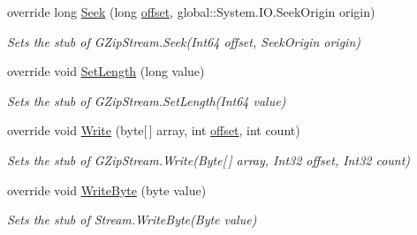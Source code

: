 \begin{DoxyCompactItemize}
override long \hyperlink{class_system_1_1_i_o_1_1_compression_1_1_fakes_1_1_stub_g_zip_stream_a658633413d0005f9dada60df7ccd842a}{Seek} (long \hyperlink{jquery-1_810_82_8js_a4a9f594d20d927164551fc7fa4751a2f}{offset}, global\-::\-System.\-I\-O.\-Seek\-Origin origin)
\begin{DoxyCompactList}\small\item\em Sets the stub of G\-Zip\-Stream.\-Seek(\-Int64 offset, Seek\-Origin origin)\end{DoxyCompactList}\item 
override void \hyperlink{class_system_1_1_i_o_1_1_compression_1_1_fakes_1_1_stub_g_zip_stream_a6b692472cb7a10bd837822dfc176e78a}{Set\-Length} (long value)
\begin{DoxyCompactList}\small\item\em Sets the stub of G\-Zip\-Stream.\-Set\-Length(\-Int64 value)\end{DoxyCompactList}\item 
override void \hyperlink{class_system_1_1_i_o_1_1_compression_1_1_fakes_1_1_stub_g_zip_stream_ac0e61a01e5b57ce436aa52b1aae9ac74}{Write} (byte\mbox{[}$\,$\mbox{]} array, int \hyperlink{jquery-1_810_82_8js_a4a9f594d20d927164551fc7fa4751a2f}{offset}, int count)
\begin{DoxyCompactList}\small\item\em Sets the stub of G\-Zip\-Stream.\-Write(\-Byte\mbox{[}$\,$\mbox{]} array, Int32 offset, Int32 count)\end{DoxyCompactList}\item 
override void \hyperlink{class_system_1_1_i_o_1_1_compression_1_1_fakes_1_1_stub_g_zip_stream_a48a15ed3e5d66678d275cccc1396a584}{Write\-Byte} (byte value)
\begin{DoxyCompactList}\small\item\em Sets the stub of Stream.\-Write\-Byte(\-Byte value)\end{DoxyCompactList}\end{DoxyCompactItemize}
